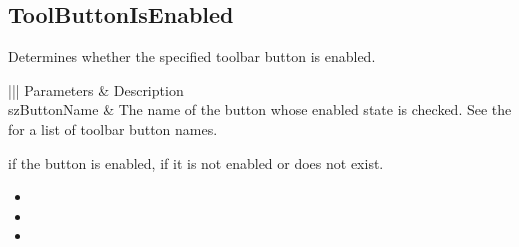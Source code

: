 \documentclass[letterpaper,12pt,english,openany,oneside]{sphinxmanual}
\begin{document}
\subsection{ToolButtonIsEnabled}
\label{\detokenize{IAC_API_OLE_Objects:toolbuttonisenabled}}
Determines whether the specified toolbar button is enabled.


\begin{sphinxVerbatim}[commandchars=\\\{\}]
  
\end{sphinxVerbatim}
\label{\detokenize{IAC_API_OLE_Objects:parameters-16}}


\begin{savenotes}\sphinxattablestart
\centering
{}\label{\detokenize{IAC_API_OLE_Objects:section-18}}\nobreak
\begin{tabular}[t]{|||}
\hline
\sphinxstyletheadfamily 
Parameters
&\sphinxstyletheadfamily 
Description
\\
\hline
szButtonName
&
The name of the button whose enabled state is checked. See the  for a list of toolbar button names.
\\
\hline
\end{tabular}
\par
\sphinxattableend\end{savenotes}


 if the button is enabled,  if it is not enabled or does not exist.

\label{\detokenize{IAC_API_OLE_Objects:related-methods-24}}
\begin{itemize}
\item {} 
 

\item {} 
 

\item {} 
 

\end{itemize}
\end{document}
